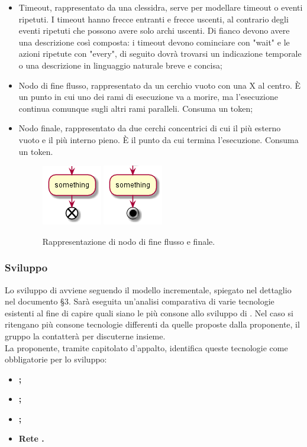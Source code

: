 \documentclass[NormeDiProgetto.tex]{subfiles}
\begin{document}
\begin{itemize}
\item Timeout, rappresentato da una clessidra, serve per modellare timeout o eventi ripetuti. I timeout hanno frecce entranti e frecce uscenti, al contrario degli eventi ripetuti che possono avere solo archi uscenti. Di fianco devono avere una descrizione così composta: i timeout devono cominciare con "wait" e le azioni ripetute con "every", di seguito dovrà trovarsi un indicazione temporale o una descrizione in linguaggio naturale breve e concisa;
\item Nodo di fine flusso, rappresentato da un cerchio vuoto con una X al centro. \`E
un punto in cui uno dei rami di esecuzione va a morire, ma l'esecuzione continua comunque sugli altri rami paralleli. Consuma un token;
\item Nodo finale, rappresentato da due cerchi concentrici di cui il più esterno vuoto e il più interno pieno. \`E il punto da cui termina l'esecuzione. Consuma un token.
\begin{figure}[H]
	\centering
	\includegraphics[width=0.2\linewidth]{progettazione/endact}
	\quad
	\includegraphics[width=0.2\linewidth]{progettazione/stopact}
	\label{fig:endact}
	\caption{Rappresentazione di nodo di fine flusso e finale.}
\end{figure}


\end{itemize}

\subsubsection{Sviluppo}
Lo sviluppo di \progetto avviene seguendo il modello incrementale, spiegato nel dettaglio nel documento \pdp \S 3. Sarà eseguita un'analisi comparativa di varie tecnologie esistenti al fine di capire quali siano le più consone allo sviluppo di \progetto. Nel caso si ritengano più consone tecnologie differenti da quelle proposte dalla proponente, il gruppo \gruppo la contatterà per discuterne insieme.\\
La proponente, tramite capitolato d'appalto, identifica queste tecnologie come obbligatorie per lo sviluppo:\\
\begin{itemize}
	\item \textbf{;}
	\item \textbf{;}
	\item \textbf{;}
	\item \textbf{Rete .}
\end{itemize}
\end{document}
